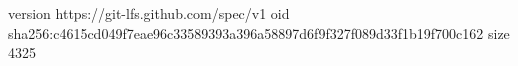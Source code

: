 version https://git-lfs.github.com/spec/v1
oid sha256:c4615cd049f7eae96c33589393a396a58897d6f9f327f089d33f1b19f700c162
size 4325
